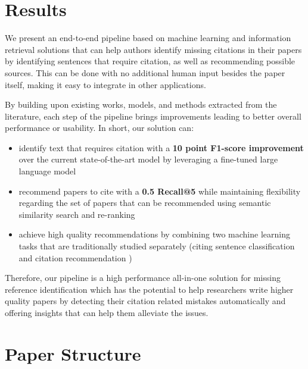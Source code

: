 \documentclass[12pt,a4paper]{report}
\begin{document}
\section{Results}

We present an end-to-end pipeline based on machine learning and information retrieval solutions that can help authors identify missing citations in their papers by identifying sentences that require citation, as well as recommending possible sources. This can be done with no additional human input besides the paper itself, making it easy to integrate in other applications.

By building upon existing works, models, and methods extracted from the literature, each step of the pipeline brings improvements leading to better overall performance or usability. In short, our solution can:

\begin{itemize}
    \item identify text that requires citation with a \textbf{10 point F1-score improvement} over the current state-of-the-art model \cite{Wright2021CiteWorthCD} by leveraging a fine-tuned large language model
    \item recommend papers to cite with a \textbf{0.5 Recall@5} while maintaining flexibility regarding the set of papers that can be recommended using semantic similarity search and re-ranking
    \item achieve high quality recommendations by combining two machine learning tasks that are traditionally studied separately (citing sentence classification \cite{Sugiyama2010IdentifyingCS} and citation recommendation \cite{He2010ContextawareCR})
\end{itemize}

Therefore, our pipeline is a high performance all-in-one solution for missing reference identification which has the potential to help researchers write higher quality papers by detecting their citation related mistakes automatically and offering insights that can help them alleviate the issues.

\section{Paper Structure}
\end{document}
